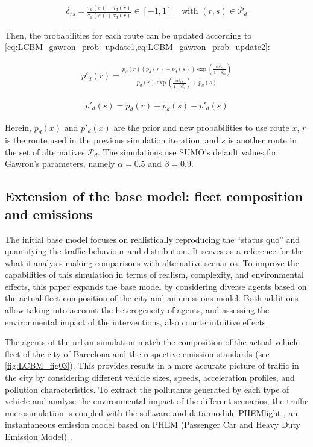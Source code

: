 \begin{align}
   \delta_{rs} = \frac{\tau_d(s) - \tau_d(r)}{\tau_d(s) + \tau_d(r)} \in [-1, 1] & \text{ with }(r,s) \in \mathcal{P}_d \label{eq:LCBM_gawron_delta_rs}
\end{align}

Then, the probabilities for each route can be updated according to \cref{eq:LCBM_gawron_prob_update1,eq:LCBM_gawron_prob_update2}:

\begin{align}
   p'_d(r) = \frac{p_d(r) \left(p_d(r) + p_d(s)\right) \exp\left(\frac{\alpha \delta_{rs}}{1 - \delta_{rs}^2}\right)}{p_d(r) \exp\left(\frac{\alpha \delta_{rs}}{1 - \delta_{rs}^2}\right) + p_d(s)} \label{eq:LCBM_gawron_prob_update1}
\end{align}

\begin{align}
   p'_d(s) = p_d(r) + p_d(s) - p'_d(s) \label{eq:LCBM_gawron_prob_update2}
\end{align}

Herein, $p_d (x)$ and $p'_d (x)$ are the prior and new probabilities to use route $x$, $r$ is the route used in the previous simulation iteration, and $s$ is another route in the set of alternatives $\mathcal{P}_d$. The simulations use SUMO’s default values for Gawron’s parameters, namely $\alpha=0.5$ and $\beta=0.9$.

\subsection{Extension of the base model: fleet composition and emissions}
\label{subsec:LCBM_2.2_ext_base_model}

The initial base model focuses on realistically reproducing the “status quo” and quantifying the traffic behaviour and distribution. It serves as a reference for the what-if analysis making comparisons with alternative scenarios. To improve the capabilities of this simulation in terms of realism, complexity, and environmental effects, this paper expands the base model by considering diverse agents based on the actual fleet composition of the city and an emissions model. Both additions allow taking into account the heterogeneity of agents, and assessing the environmental impact of the interventions, also counterintuitive effects. 

The agents of the urban simulation match the composition of the actual vehicle fleet of the city of Barcelona \citep{Rodriguez-Rey2022,AjuntamentdeBarcelona2017} and the respective emission standards (see \cref{fig:LCBM_fig03}). This provides results in a more accurate picture of traffic in the city by considering different vehicle sizes, speeds, acceleration profiles, and pollution characteristics. To extract the pollutants generated by each type of vehicle and analyse the environmental impact of the different scenarios, the traffic microsimulation is coupled with the software and data module PHEMlight \citep{Hausberger2014}, an instantaneous emission model based on PHEM (Passenger Car and Heavy Duty Emission Model) \citep{Rexeis2014,Hausberger2009}.

